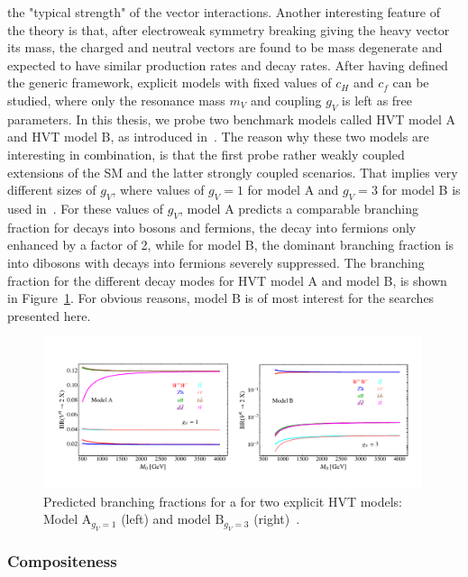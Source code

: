 the "typical strength" of the vector interactions. Another interesting feature of the theory is that, after electroweak symmetry breaking giving the heavy vector its mass, the charged and neutral vectors are found to be mass degenerate and expected to have similar production rates and decay rates.\newline
After having defined the generic framework, explicit models with fixed values of $c_H$ and $c_f$ can be studied, where only the resonance mass $m_V$ and coupling $g_V$ is left as free parameters.
In this thesis, we probe two benchmark models called HVT model A and HVT model B, as introduced in~\cite{Pappadopulo:2014qza}. The reason why these two models are interesting in combination, is that the first probe rather weakly coupled extensions of the SM and the latter strongly coupled scenarios. That implies very different sizes of $g_V$, where values of $g_V = 1$ for model A and $g_V = 3$ for model B is used in~\cite{Pappadopulo:2014qza}. For these values of $g_V$, model A predicts a comparable branching fraction for decays into bosons and fermions, the decay into fermions only enhanced by a factor of 2, while for model B, the dominant branching fraction is into dibosons with decays into fermions severely suppressed. The branching fraction for the different decay modes for HVT model A and model B, is shown in Figure~\ref{fig:theory:hvtBR}. For obvious reasons, model B is of most interest for the searches presented here.
\begin{figure}[h!]
\centering
\includegraphics[width=0.99\textwidth]{figures/theory/hvtmodels.pdf}
\caption{Predicted branching fractions for a \PZpr for two explicit HVT models: Model  $\mathrm{A}_{g_V=1}$ (left) and model $\mathrm{B}_{g_V=3}$ (right)~\cite{Pappadopulo:2014qza}.}
\label{fig:theory:hvtBR}
\end{figure}

\subsubsection{Compositeness}